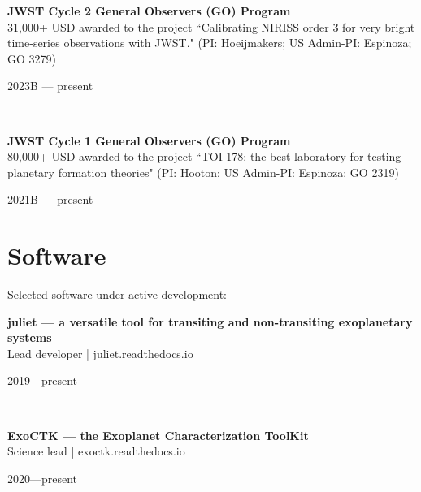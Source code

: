 \documentclass[12pt, a4paper]{article} %
\begin{document}
\begin{minipage}[t]{0.7\textwidth}
\begin{flushleft}%
  \setlength{\leftskip}{0.2cm}%
\textbf{JWST Cycle 2 General Observers (GO) Program}\\
31,000+ USD awarded to the project ``Calibrating NIRISS order 3 for very bright time-series observations with JWST." (PI: Hoeijmakers; US Admin-PI: Espinoza; GO 3279)
\end{flushleft}
\end{minipage}
\begin{minipage}[t]{0.3\textwidth}
\hfill 2023B --- present
\end{minipage}\\

\begin{minipage}[t]{0.7\textwidth}
\begin{flushleft}%
  \setlength{\leftskip}{0.2cm}%
\textbf{JWST Cycle 1 General Observers (GO) Program}\\
80,000+ USD awarded to the project ``TOI-178: the best laboratory for testing planetary formation theories" (PI: Hooton; US Admin-PI: Espinoza; GO 2319)
\end{flushleft}
\end{minipage}
\begin{minipage}[t]{0.3\textwidth}
\hfill 2021B --- present
\end{minipage}

\section*{Software}
Selected software under active development:\\

\begin{minipage}[t]{0.7\textwidth}
\begin{flushleft}%
  \setlength{\leftskip}{0.2cm}%
\textbf{juliet --- a versatile tool for transiting and non-transiting exoplanetary systems}\\
Lead developer | juliet.readthedocs.io
\end{flushleft}
\end{minipage}
\begin{minipage}[t]{0.3\textwidth}
\hfill 2019---present
\end{minipage}\\

\begin{minipage}[t]{0.7\textwidth}
\begin{flushleft}%
  \setlength{\leftskip}{0.2cm}%
\textbf{ExoCTK --- the Exoplanet Characterization ToolKit}\\
Science lead | exoctk.readthedocs.io
\end{flushleft}
\end{minipage}
\begin{minipage}[t]{0.3\textwidth}
\hfill 2020---present
\end{minipage}\\
\end{document}
